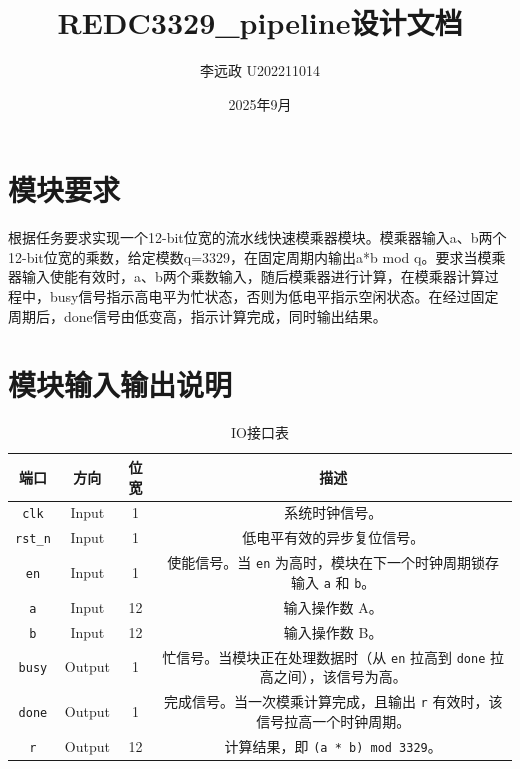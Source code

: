 \documentclass[UTF8]{ctexart}
\title{REDC3329\_pipeline设计文档}
\author{李远政 U202211014}
\date{2025年9月}
\begin{document}
	\maketitle
	\tableofcontents
	\newpage
	\fancyfoot[C]{\thepage}
	\section{模块要求}
根据任务要求实现一个12-bit位宽的流水线快速模乘器模块。模乘器输入a、b两个12-bit位宽的乘数，给定模数q=3329，在固定周期内输出a*b mod q。要求当模乘器输入使能有效时，a、b两个乘数输入，随后模乘器进行计算，在模乘器计算过程中，busy信号指示高电平为忙状态，否则为低电平指示空闲状态。在经过固定周期后，done信号由低变高，指示计算完成，同时输出结果。
	\section{模块输入输出说明}

	\begin{table}[h!]
		\begin{center}
			\caption{IO接口表}
			\setlength{\tabcolsep}{2pt}
			\begin{tabular}{c c c c}
\toprule
        \textbf{端口} & \textbf{方向} & \textbf{位宽} & \textbf{描述} \\
        \midrule
        \texttt{clk}   & Input  & 1  & 系统时钟信号。 \\
        \texttt{rst\_n} & Input  & 1  & 低电平有效的异步复位信号。 \\
        \texttt{en}    & Input  & 1  & 使能信号。当 \texttt{en} 为高时，模块在下一个时钟周期锁存输入 \texttt{a} 和 \texttt{b}。 \\
        \texttt{a}     & Input  & 12 & 输入操作数 A。 \\
        \texttt{b}     & Input  & 12 & 输入操作数 B。 \\
        \texttt{busy}  & Output & 1  & 忙信号。当模块正在处理数据时（从 \texttt{en} 拉高到 \texttt{done} 拉高之间），该信号为高。 \\
        \texttt{done}  & Output & 1  & 完成信号。当一次模乘计算完成，且输出 \texttt{r} 有效时，该信号拉高一个时钟周期。 \\
        \texttt{r}     & Output & 12 & 计算结果，即 \texttt{(a * b) mod 3329}。 \\
        \bottomrule
			\end{tabular}
		\end{center}
	\end{table}
\end{document}
